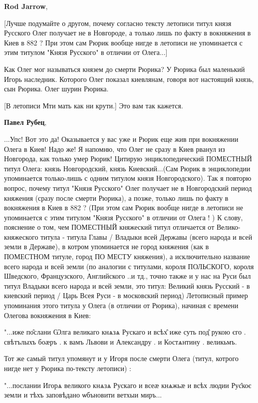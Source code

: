 \begin{itemize}
\begin{itemize}
\textbf{Rod Jarrow}, 

[Лучше подумайте о другом, почему согласно тексту летописи титул князя Русского
Олег получает не в Новгороде, а только лишь по факту в вокняжения в Киев в 882
? При этом сам Рюрик вообще нигде в летописи не упоминается с этим титулом
"Князя Русского" в отличии от Олега...]

Как Олег мог называться князем до смерти Рюрика? У Рюрика был маленький Игорь
наследник. Которого Олег показал киевлянам, говоря вот настоящий князь, сын
Рюрика. Олег шурин Рюрика.

[В летописи Мти мать как ни крути.] Это вам так кажется.

\textbf{Павел Рубец}, 

...Упс! Вот это да! Оказывается у вас уже и Рюрик еще жив при вокняжении Олега
в Киев! Надо же! Я напомню, что Олег не сразу в Киев рванул из Новгорода, как
только умер Рюрик! Цитирую энциклопедический ПОМЕСТНЫЙ титул Олега: князь
Новгородский, князь Киевский...(Сам Рюрик в энциклопедии упоминается
только-лишь с одним титулом князя Новгородского). Так я повторю вопрос, почему
титул "Князя Русского" Олег получает не в Новгородский период княжения (сразу
после смерти Рюрика), а позже, только лишь по факту в вокняжения в Киев в 882 ?
(При этом сам Рюрик вообще нигде в летописи не упоминается с этим титулом
"Князя Русского" в отличии от Олега ! ) К слову, пояснение о том, чем ПОМЕСТНЫЙ
княжеский титул отличается от Велико-княжеского титула - титула Главы / Владыки
всей Державы (всего народа и всей земли в Державе), в котром упоминается не
город княжения (как в ПОМЕСТНОМ титуле, город ПО МЕСТУ княжения), а
исключительно название всего народа и всей земли (по аналогии с титулами,
короля ПОЛЬСКОГО, короля Шведского, Французского, Английского ..и тд., точно
также и у нас на Руси был титул Владыки всего народа и всей земли, это титул:
Великий князь Русский - в киевский период / Царь Всея Руси - в московский
период) Летописный пример упоминания этого титула у Олега (в отличии от
Рюрика), начиная с времени Олегова вокняжения в Киев:

"...иже по̑слани Ѡлга великаго кнѧзѧ Рускаго и всѣх̑ иже суть под̑ рукою єго .
свѣтълыхъ боӕръ . к вамъ Львови и Александру . и Костѧнтину . великьмъ.

Тот же самый титул упомянут и у Игоря после смерти Олега (титул, котрого нигде
нет у Рюрика по-тексту летописи) :

"...послании Игорѧ великого кнѧзѧ Рускаго и всеӕ кнѧжьӕ и всѣх людии Рус̑коє
земли и тѣхъ заповѣдано ѡбъновити ветхыи миръ...


\end{itemize}
\end{itemize}
